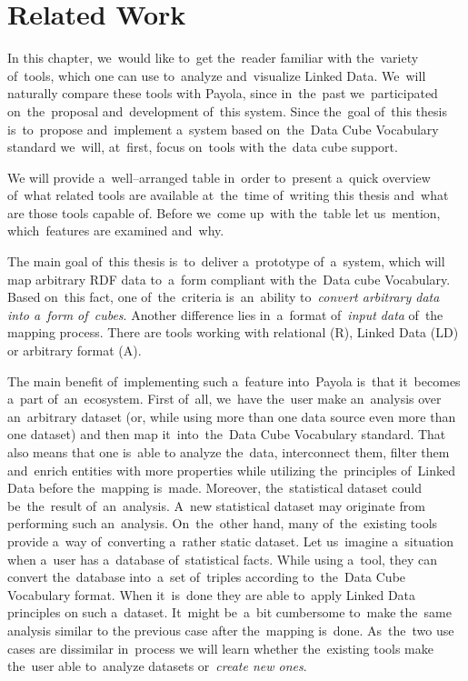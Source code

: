 \chapter{Related Work}
\label{chap:rw}

In this chapter, we~would like to~get the~reader familiar with the~variety of~tools, which one can
use to~analyze and~visualize Linked Data. We~will naturally compare these tools with
Payola, since in~the~past we~participated on~the~proposal and~development of~this system.
Since the~goal of~this thesis is~to~propose and~implement a~system based on~the~Data Cube Vocabulary
standard we~will, at~first, focus on~tools with the~data cube support. 

We will provide a~well--arranged table in~order to~present a~quick overview of~what related tools are available at~the~time of~writing this thesis and~what are those 
tools capable of. Before we~come up~with the~table let us~mention, which~features are examined and~why.

The main goal of~this thesis is~to~deliver a~prototype of~a~system, which will map 
arbitrary RDF data to~a~form compliant with the~Data cube Vocabulary. Based on~this fact, one of~the~criteria is~an~ability to~\emph{convert arbitrary data 
into a~form of~cubes}. Another difference lies in~a~format of~\emph{input data} of~the
mapping process. There are tools working with relational (R), Linked Data (LD) or
arbitrary format (A).

The main benefit of~implementing such a~feature into~Payola is~that it~becomes a~part of~an~ecosystem. First of~all, we~have the~user make an~analysis over an~arbitrary
dataset (or, while using more than one data source even more than one dataset)
and then map it~into~the~Data Cube Vocabulary standard. That also means that one is~able
to analyze the~data, interconnect them, filter them and~enrich entities with more properties
while utilizing the~principles of~Linked Data before the~mapping is~made. Moreover, the~statistical
dataset could be~the~result of~an~analysis. A~new statistical dataset may originate from performing
such an~analysis. On~the~other hand, many of~the~existing 
tools provide a~way of~converting a~rather static dataset. Let us~imagine a~situation when a~user has a~database of~statistical facts. While using a~tool, they can 
convert the~database into~a~set of~triples according to~the~Data Cube 
Vocabulary format. When it~is~done they are able to~apply Linked Data principles
on such a~dataset. It~might be~a~bit cumbersome to~make the~same analysis similar to
the previous case after the~mapping is~done. As~the~two use cases are dissimilar in~process 
we will learn whether the~existing tools make the~user able to~analyze datasets or~\emph{create new ones}.

